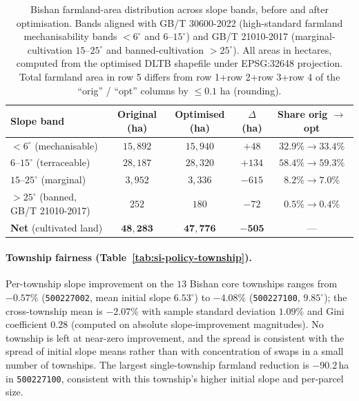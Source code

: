 \documentclass[11pt]{article}
\begin{document}
\begin{table}[htbp]
\centering
\small
\caption{Bishan farmland-area distribution across slope bands, before and after optimisation. Bands aligned with GB/T 30600-2022 (high-standard farmland mechanisability bands $<6^{\circ}$ and $6$--$15^{\circ}$) and GB/T 21010-2017 (marginal-cultivation $15$--$25^{\circ}$ and banned-cultivation $>25^{\circ}$). All areas in hectares, computed from the optimised DLTB shapefile under EPSG:32648 projection. Total farmland area in row 5 differs from row 1+row 2+row 3+row 4 of the ``orig'' / ``opt'' columns by $\le 0.1$ ha (rounding).}
\label{tab:si-policy-slope-bands}
\begin{tabular}{lcccc}
\toprule
Slope band & Original (ha) & Optimised (ha) & $\Delta$ (ha) & Share orig $\to$ opt \\
\midrule
$<6^{\circ}$ (mechanisable) & $15{,}892$ & $15{,}940$ & $+48$ & $32.9\% \to 33.4\%$ \\
$6$--$15^{\circ}$ (terraceable) & $28{,}187$ & $28{,}320$ & $+134$ & $58.4\% \to 59.3\%$ \\
$15$--$25^{\circ}$ (marginal) & $3{,}952$ & $3{,}336$ & $-615$ & $8.2\% \to 7.0\%$ \\
$>25^{\circ}$ (banned, GB/T 21010-2017) & $252$ & $180$ & $-72$ & $0.5\% \to 0.4\%$ \\
\midrule
\textbf{Net} (cultivated land) & $\mathbf{48{,}283}$ & $\mathbf{47{,}776}$ & $\mathbf{-505}$ & --- \\
\bottomrule
\end{tabular}
\end{table}

\paragraph{Township fairness (Table~\ref{tab:si-policy-township}).} Per-township slope improvement on the $13$ Bishan core townships ranges from $-0.57\%$ (\texttt{500227002}, mean initial slope $6.53^{\circ}$) to $-4.08\%$ (\texttt{500227100}, $9.85^{\circ}$); the cross-township mean is $-2.07\%$ with sample standard deviation $1.09\%$ and Gini coefficient $0.28$ (computed on absolute slope-improvement magnitudes). No township is left at near-zero improvement, and the spread is consistent with the spread of initial slope means rather than with concentration of swaps in a small number of townships. The largest single-township farmland reduction is $-90.2$\,ha in \texttt{500227100}, consistent with this township's higher initial slope and per-parcel size.
\end{document}
